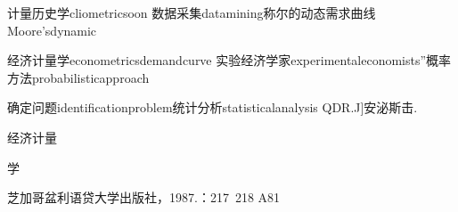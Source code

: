 计量历史学cliometricsoon
数据采集datamining称尔的动态需求曲线Moore’sdynamic

经济计量学econometricsdemandcurve
实验经济学家experimentaleconomists”概率方法probabilisticapproach

确定问题identificationproblem统计分析statisticalanalysis
QDR.J]安泌斯击.

经济计量

学

芝加哥盆利语贷大学出版社，1987.：217~218
A81



